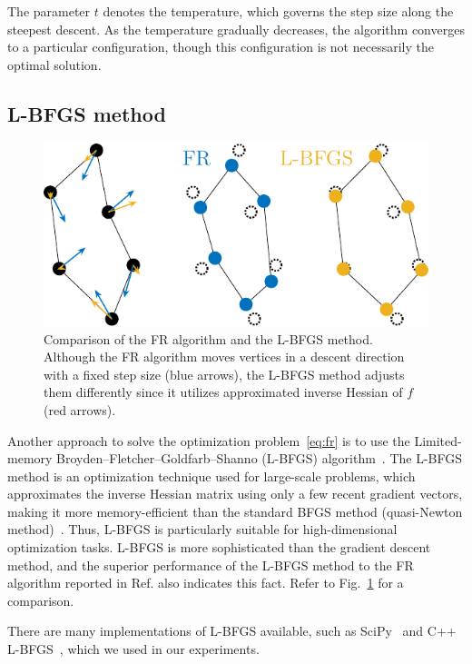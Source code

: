 \documentclass[dvipdfmx,journal]{IEEEtran}
\begin{document}
The parameter $t$ denotes the temperature, which governs the step size along the steepest descent. As the temperature gradually decreases, the algorithm converges to a particular configuration, though this configuration is not necessarily the optimal solution.

\subsection{L-BFGS method}\label{ssec:lbfgs}

\begin{figure}[t]
  \centering
  \includegraphics[width=0.713\columnwidth]{comparison/comparison_FRandLBFGS.pdf}
  \caption{
    Comparison of the FR algorithm and the L-BFGS method.
    Although the FR algorithm moves vertices in a descent direction with a fixed step size (blue arrows), the L-BFGS method adjusts them differently since it utilizes approximated inverse Hessian of $f$ (red arrows).
  }
  \label{fig:comparisonFRandLBFGS}
\end{figure}

Another approach to solve the optimization problem~\eqref{eq:fr} is to use the Limited-memory Broyden--Fletcher--Goldfarb--Shanno (L-BFGS) algorithm~\cite{6183577}.
The L-BFGS method is an optimization technique used for large-scale problems, which approximates the inverse Hessian matrix using only a few recent gradient vectors, making it more memory-efficient than the standard BFGS method (quasi-Newton method)~\cite{liuLimitedMemoryBFGS1989}.
Thus, L-BFGS is particularly suitable for high-dimensional optimization tasks. L-BFGS is more sophisticated than the gradient descent method, and the superior performance of the L-BFGS method to the FR algorithm reported in Ref.\cite{6183577} also indicates this fact. Refer to Fig.~\ref{fig:comparisonFRandLBFGS} for a comparison.

There are many implementations of L-BFGS available, such as SciPy~\cite{2020SciPy-NMeth} and C++ L-BFGS~\cite{qiuYixuanLBFGSpp2024,okazakiChokkanLiblbfgs2024}, which we used in our experiments.
\end{document}
